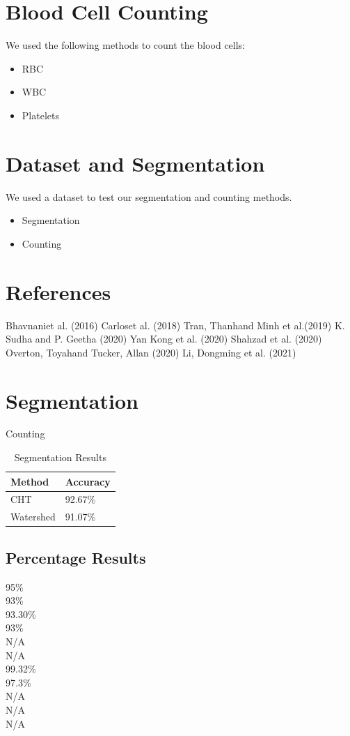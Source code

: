 \documentclass[conference]{IEEEtran}
\begin{document}
\section{Blood Cell Counting}
We used the following methods to count the blood cells:
\begin{itemize}
\item RBC
\item WBC
\item Platelets
\end{itemize}
\section{Dataset and Segmentation}
We used a dataset to test our segmentation and counting methods.
\begin{itemize}
\item Segmentation
\item Counting
\end{itemize}
\section{References}
Bhavnaniet al. (2016)
Carloset al. (2018)
Tran, Thanhand Minh et al.(2019)
K. Sudha and P. Geetha (2020)
Yan Kong et al. (2020)
Shahzad et al. (2020)
Overton, Toyahand Tucker, Allan (2020)
Li, Dongming et al. (2021)

\section{Segmentation}
Counting
\begin{table}[htbp]
\centering
\caption{Segmentation Results}
\label{tab:segmentation}
\begin{tabular}{ll}
Method & Accuracy \\
\hline
CHT & 92.67\% \\
Watershed & 91.07\% \\
\hline
\end{tabular}
\end{table}
\subsection{Percentage Results}
95\% \\
93\% \\
93.30\% \\
93\% \\
N/A \\
N/A \\
99.32\% \\
97.3\% \\
N/A \\
N/A \\
N/A
\end{document}
